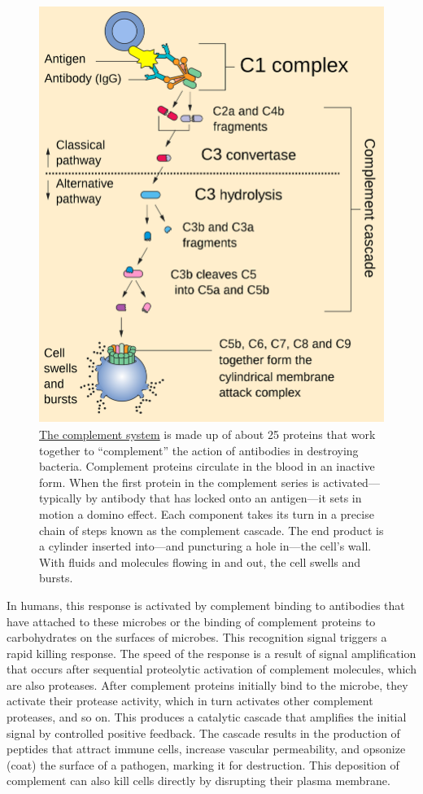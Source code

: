 \begin{figure}

{\centering \includegraphics[width=0.7\linewidth]{./figures/immune/Complement_pathway} 

}

\caption{\href{https://commons.wikimedia.org/wiki/File:Complement_pathway.svg}{The complement system} is made up of about 25 proteins that work together to ``complement'' the action of antibodies in destroying bacteria. Complement proteins circulate in the blood in an inactive form. When the first protein in the complement series is activated--- typically by antibody that has locked onto an antigen---it sets in motion a domino effect. Each component takes its turn in a precise chain of steps known as the complement cascade. The end product is a cylinder inserted into---and puncturing a hole in---the cell's wall. With fluids and molecules flowing in and out, the cell swells and bursts.}\label{fig:complementsystem}
\end{figure}

In humans, this response is activated by complement binding to antibodies that have attached to these microbes or the binding of complement proteins to carbohydrates on the surfaces of microbes. This recognition signal triggers a rapid killing response. The speed of the response is a result of signal amplification that occurs after sequential proteolytic activation of complement molecules, which are also proteases. After complement proteins initially bind to the microbe, they activate their protease activity, which in turn activates other complement proteases, and so on. This produces a catalytic cascade that amplifies the initial signal by controlled positive feedback. The cascade results in the production of peptides that attract immune cells, increase vascular permeability, and opsonize (coat) the surface of a pathogen, marking it for destruction. This deposition of complement can also kill cells directly by disrupting their plasma membrane.

